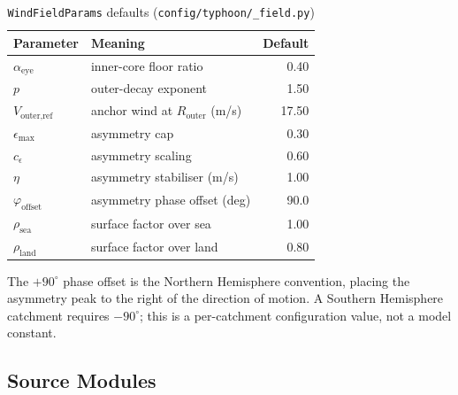 \documentclass[11pt,a4paper]{article}
\begin{document}
\begin{table}[H]
  \centering
  \caption{\texttt{WindFieldParams} defaults (\texttt{config/typhoon/\_field.py})}
  \begin{tabular}{llr}
    \toprule
    \textbf{Parameter} & \textbf{Meaning} & \textbf{Default} \\
    \midrule
    $\alpha_{\text{eye}}$ & inner-core floor ratio & 0.40 \\
    $p$ & outer-decay exponent & 1.50 \\
    $V_{\text{outer,ref}}$ & anchor wind at $R_{\text{outer}}$ (m/s) & 17.50 \\
    $\epsilon_{\max}$ & asymmetry cap & 0.30 \\
    $c_\epsilon$ & asymmetry scaling & 0.60 \\
    $\eta$ & asymmetry stabiliser (m/s) & 1.00 \\
    $\varphi_{\text{offset}}$ & asymmetry phase offset (deg) & 90.0 \\
    $\rho_{\text{sea}}$ & surface factor over sea & 1.00 \\
    $\rho_{\text{land}}$ & surface factor over land & 0.80 \\
    \bottomrule
  \end{tabular}
\end{table}

The $+90^\circ$ phase offset is the Northern Hemisphere convention, placing the
asymmetry peak to the right of the direction of motion. A Southern Hemisphere
catchment requires $-90^\circ$; this is a per-catchment configuration value, not
a model constant.

\mkmimplementation

\subsection{Source Modules}
\end{document}
